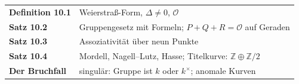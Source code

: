 \begin{merksatz}
\begin{center}
\renewcommand{\arraystretch}{1.5}
\begin{tabular}{@{}P{3.0cm}P{5.6cm}@{}}
\toprule
\textbf{Definition 10.1} & Weierstraß-Form, $\Delta\ne0$, $\mathcal O$\\
\textbf{Satz 10.2} & Gruppengesetz mit Formeln; $P + Q + R = \mathcal O$ auf Geraden\\
\textbf{Satz 10.3} & Assoziativität über neun Punkte\\
\textbf{Satz 10.4} & Mordell, Nagell--Lutz, Hasse; Titelkurve: $\mathbb Z\oplus\mathbb Z/2$\\
\textbf{Der Bruchfall} & singulär: Gruppe ist $k$ oder $k^{\times}$; anomale Kurven\\
\bottomrule
\end{tabular}
\end{center}

\begin{center}
\begin{minipage}{0.88\textwidth}
\end{minipage}
\end{center}
\end{merksatz}
